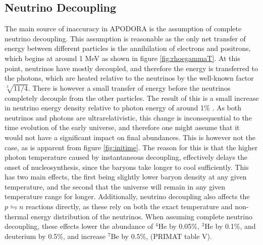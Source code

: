 \subsection{Neutrino Decoupling}
\label{sec:decoupling}
The main source of inaccuracy in APODORA is the assumption of complete neutrino decoupling. This assumption is reasonable as the only net transfer of energy between different particles is the annihilation of electrons and positrons, which begins at around 1 MeV as shown in figure \ref{fig:rhoegammaT}. At this point, neutrinos have mostly decoupled, and therefore the energy is transferred to the photons, which are heated relative to the neutrinos by the well-known factor $\sqrt[3]{11/4}$. There is however a small transfer of energy before the neutrinos completely decouple from the other particles. The result of this is a small increase in neutrino energy density relative to photon energy of around 1\% \cite{Hannestad:1995rs}. As both neutrinos and photons are ultrarelativistic, this change is inconsequential to the time evolution of the early universe, and therefore one might assume that it would not have a significant impact on final abundances. This is however not the case, as is apparent from figure \ref{fig:initime}. The reason for this is that the higher photon temperature caused by instantaneous decoupling, effectively delays the onset of nucleosynthesis, since the baryons take longer to cool sufficiently. This has two main effects, the first being slightly lower baryon density at any given temperature, and the second that the universe will remain in any given temperature range for longer. Additionally, neutrino decoupling also affects the $p\leftrightharpoons n$ reactions directly, as these rely on both the exact temperature and non-thermal energy distribution of the neutrinos. When assuming complete neutrino decoupling, these effects lower the abundance of ${}^4$He by 0.05\%, ${}^3$He by 0.1\%, and deuterium by 0.5\%, and increase ${}^7$Be by 0.5\%, (PRIMAT table V\cite{PRIMAT}). 

